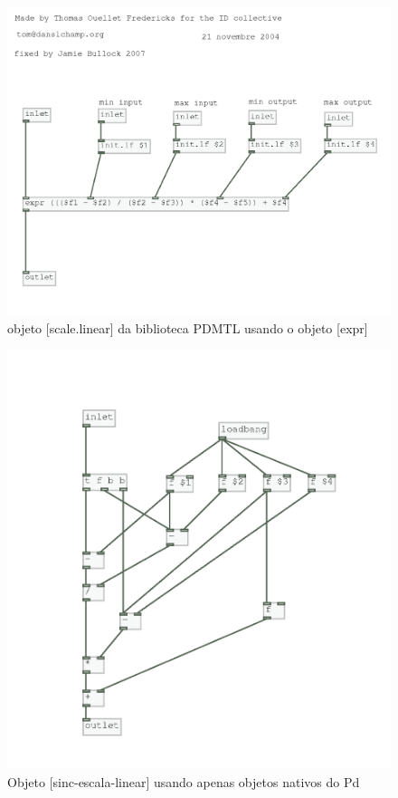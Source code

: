 \documentclass[draft]{ppgmus}
\begin{document}
\begin{figure}
\includegraphics[scale=.6]{escale-pdmtl}
\caption{objeto [scale.linear] da biblioteca PDMTL usando o objeto [expr]}
\label{escale-linear}
\end{figure}

\begin{figure}
\includegraphics[scale=.6]{sinc-escala-linear}
\caption{Objeto [sinc-escala-linear] usando apenas objetos nativos do Pd}
\label{sinc-linear}
\end{figure}
\end{document}

